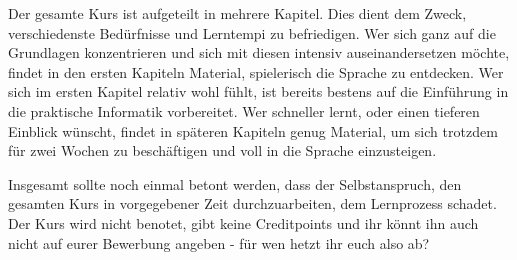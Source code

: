 \documentclass{vorkurs}
\begin{document}
Der gesamte Kurs ist aufgeteilt in mehrere Kapitel. Dies dient dem Zweck,
verschiedenste Bedürfnisse und Lerntempi zu befriedigen.  Wer sich ganz auf die
Grundlagen konzentrieren und sich mit diesen intensiv auseinandersetzen möchte,
findet in den ersten Kapiteln Material, spielerisch die Sprache zu entdecken.
Wer sich im ersten Kapitel relativ wohl fühlt, ist bereits bestens auf die
Einführung in die praktische Informatik vorbereitet.  Wer schneller lernt, oder
einen tieferen Einblick wünscht, findet in späteren Kapiteln genug Material, um
sich trotzdem für zwei Wochen zu beschäftigen und voll in die Sprache
einzusteigen.

Insgesamt sollte noch einmal betont werden, dass der Selbstanspruch, den
gesamten Kurs in vorgegebener Zeit durchzuarbeiten, dem Lernprozess schadet.
Der Kurs wird nicht benotet, gibt keine Creditpoints und ihr könnt ihn auch
nicht auf eurer Bewerbung angeben - für wen hetzt ihr euch also ab?

\tableofcontents


\end{document}
